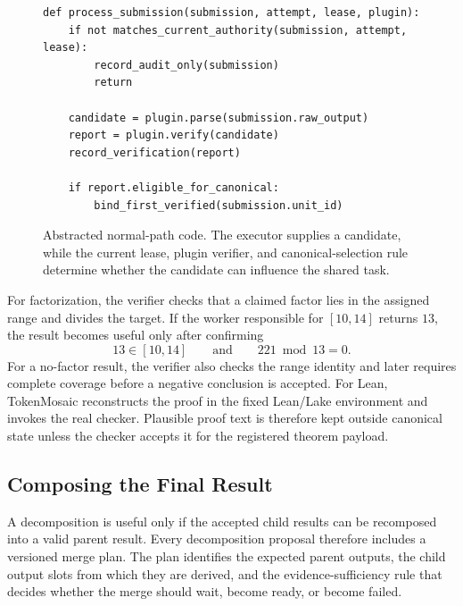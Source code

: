 \documentclass{article}
\theoremstyle{plain}
\begin{document}
\begin{figure}[!h]
\centering
\begin{minipage}{0.94\linewidth}
\small
\begin{verbatim}
def process_submission(submission, attempt, lease, plugin):
    if not matches_current_authority(submission, attempt, lease):
        record_audit_only(submission)
        return

    candidate = plugin.parse(submission.raw_output)
    report = plugin.verify(candidate)
    record_verification(report)

    if report.eligible_for_canonical:
        bind_first_verified(submission.unit_id)
\end{verbatim}
\end{minipage}
\caption{Abstracted normal-path code. The executor supplies a candidate, while the current lease, plugin verifier, and canonical-selection rule determine whether the candidate can influence the shared task.}
\label{fig:submission-code-balanced}
\end{figure}

For factorization, the verifier checks that a claimed factor lies in the assigned range and divides the target. If the worker responsible for $[10,14]$ returns $13$, the result becomes useful only after confirming
\begin{equation}
13\in[10,14]
\qquad\text{and}\qquad
221\bmod 13=0.
\label{eq:factor-example}
\end{equation}
For a no-factor result, the verifier also checks the range identity and later requires complete coverage before a negative conclusion is accepted. For Lean, TokenMosaic reconstructs the proof in the fixed Lean/Lake environment and invokes the real checker. Plausible proof text is therefore kept outside canonical state unless the checker accepts it for the registered theorem payload.

\subsection{Composing the Final Result}
\label{subsec:result-composition}

A decomposition is useful only if the accepted child results can be recomposed into a valid parent result. Every decomposition proposal therefore includes a versioned merge plan. The plan identifies the expected parent outputs, the child output slots from which they are derived, and the evidence-sufficiency rule that decides whether the merge should \textsf{wait}, become \textsf{ready}, or become \textsf{failed}.
\end{document}
